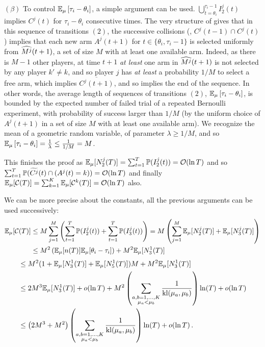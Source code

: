 \begin{smallproof}
  $(\beta)$ To control $\mathbb{E}_{\mu}\left[ \tau_i - \theta_i \right]$,
  a simple argument can be used.
  $\bigcup_{t=\theta_i}^{\tau_i-1} I_2^j(t)$
  implies $C^j(t)$ for $\tau_i - \theta_i$ consecutive times.
  The very structure of \RandTopM{} gives that in this sequence of transitions $(2)$,
  the successive collisions (\ie, $C^j(t-1) \cap C^j(t)$)
  implies that each new arm $A^j(t+1)$ for $t \in \{\theta_i, \tau_i-1\}$ is selected uniformly from
  $\widehat{M^j}(t+1)$,
  a set of size $M$ with at least one available arm.
  Indeed, as there is $M-1$ other players, at time $t+1$ \emph{at least} one arm in $\widehat{M^j}(t+1)$ is not selected by any player $k'\neq k$,
  and so player $j$ has \emph{at least} a probability $1/M$ to select
  a free arm, which implies $\overline{C^j(t+1)}$, and so implies the end of the sequence.
  In other words, the average length of sequences of transitions $(2)$,
  $\mathbb{E}_{\mu}\left[ \tau_i - \theta_i \right]$,
  is bounded by the expected number of failed trial of a repeated Bernoulli experiment, with probability of success larger than $1/M$ (by the uniform choice of $A^j(t+1)$ in a set of size $M$ with at least one available arm).
  We recognize the mean of a geometric random variable, of parameter $\lambda \geq 1/M$, and so $\mathbb{E}_{\mu}\left[ \tau_i - \theta_i \right] = \frac{1}{\lambda} \leq \frac{1}{1/M} = M$.

  This finishes the proof as $\mathbb{E}_{\mu}[N_2^j(T)] = \sum_{t=1}^T \mathbb{P}(I_2^j(t)) = \mathop{}\mathopen{}\mathcal{O}\mathopen{}\left(\ln T\right)$ and so
  $\sum_{t=1}^T \mathbb{P}(\widetilde{C^j}(t) \cap (A^j(t) = k)) = \mathop{}\mathopen{}\mathcal{O}\mathopen{}\left(\ln T\right)$
  and finally
  $\mathbb{E}_{\mu}[\mathcal{C}(T)] = \sum_{k=1}^K \mathbb{E}_{\mu}[\mathcal{C}^k(T)] = \mathop{}\mathopen{}\mathcal{O}\mathopen{}\left(\ln T\right)$ also.

  We can be more precise about the constants, all the previous arguments can be used successively:
  \begin{align}
    \mathbb{E}_{\mu}[\mathcal{C}(T)]
    &\leq M \sum_{j=1}^M \left(\sum_{t=1}^T \mathbb{P}(I_2^j(t)) + \sum_{t=1}^T \mathbb{P}(I_3^j(t))\right)
    = M \left(\sum_{j=1}^M \mathbb{E}_{\mu}[N_2^j(T)] + \mathbb{E}_{\mu}[N_3^j(T)]\right) \\
    &\leq M^2 \left(\mathbb{E}_{\mu}[n(T)] \mathbb{E}_{\mu}[\theta_i - \tau_i] \right) + M^2 \mathbb{E}_{\mu}[N_3^1(T)] \notag
  \end{align}%
  \begin{align}
    &\leq M^2 (1+\mathbb{E}_{\mu}[N_3^1(T)] + \mathbb{E}_{\mu}[N_5^1(T)]) M + M^2 \mathbb{E}_{\mu}[N_3^1(T)] \notag \\
    &\leq 2 M^3 \mathbb{E}_{\mu}[N_3^1(T)] + \mathop{}\mathopen{}o\mathopen{}\left(\ln T\right) + M^2 \left(\sum_{\substack{a,b=1,\dots,K\\\mu_a < \mu_b}} \frac{1}{\mathrm{kl}(\mu_a,\mu_b)}\right) \ln(T) + \mathop{}\mathopen{}o\mathopen{}\left(\ln T\right) \notag  \\
    &\leq \left(2 M^3 + M^2\right) \left(\sum_{\substack{a,b=1,\dots,K\\\mu_a < \mu_b}} \frac{1}{\mathrm{kl}(\mu_a,\mu_b)}\right) \ln(T) + \mathop{}\mathopen{}o\mathopen{}\left(\ln T\right).
  \end{align}


\end{smallproof}
